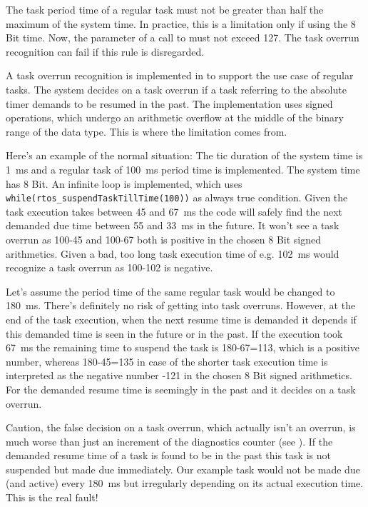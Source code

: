 The task period time of a regular task must not be greater than half the
maximum of the system time. In practice, this is a limitation only if
using the 8 Bit time. Now, the parameter of a call to
 must not exceed 127. The task overrun
recognition can fail if this rule is disregarded.

A task overrun recognition is implemented in \rtos{} to support the use case
of regular tasks. The system decides on a task overrun if a task referring
to the absolute timer demands to be resumed in the past. The
implementation uses signed operations, which undergo an arithmetic
overflow at the middle of the binary range of the data type. This is where
the limitation comes from.

Here's an example of the normal situation: The tic duration of the system
time is 1~ms and a regular task of 100~ms period time is implemented. The
system time has 8 Bit. An infinite loop is implemented, which uses
\verb+while(rtos_suspendTaskTillTime(100))+ as always true condition.
Given the task execution takes between 45 and 67~ms the \rtos{} code will
safely find the next demanded due time between 55 and 33~ms in the future.
It won't see a task overrun as 100-45 and 100-67 both is positive in the
chosen 8 Bit signed arithmetics. Given a bad, too long task execution time
of e.g. 102~ms \rtos{} would recognize a task overrun as 100-102 is
negative.

Let's assume the period time of the same regular task would be changed to
180~ms. There's definitely no risk of getting into task overruns. However,
at the end of the task execution, when the next resume time is demanded it
depends if this demanded time is seen in the future or in the past. If the
execution took 67~ms the remaining time to suspend the task is 180-67=113,
which is a positive number, whereas 180-45=135 in case of the shorter task
execution time is interpreted as the negative number -121 in the chosen 8
Bit signed arithmetics. For \rtos{} the demanded resume time is seemingly
in the past and it decides on a task overrun.

Caution, the false decision on a task overrun, which actually isn't an
overrun, is much worse than just an increment of the diagnostics counter
(see ). If the demanded resume time of
a task is found to be in the past this task is not suspended but made due
immediately. Our example task would not be made due (and active) every
180~ms but irregularly depending on its actual execution time. This is the
real fault!

